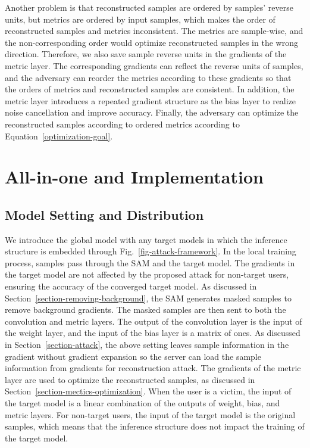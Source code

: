 \documentclass[lettersize,journal]{IEEEtran}
\begin{document}
Another problem is that reconstructed samples are ordered by samples' reverse units, but metrics are ordered by input samples, which makes the order of reconstructed samples and metrics inconsistent. The metrics are sample-wise, and the non-corresponding order would optimize reconstructed samples in the wrong direction. Therefore, we also save sample reverse units in the gradients of the metric layer. The corresponding gradients can reflect the reverse units of samples, and the adversary can reorder the metrics according to these gradients so that the orders of metrics and reconstructed samples are consistent. In addition, the metric layer introduces a repeated gradient structure as the bias layer to realize noise cancellation and improve accuracy. Finally, the adversary can optimize the reconstructed samples according to ordered metrics according to Equation~\eqref{optimization-goal}.

\section{All-in-one and Implementation}
\label{section-all-in-one}

\subsection{Model Setting and Distribution}
We introduce the global model with any target models in which the inference structure is embedded through Fig.~\ref{fig-attack-framework}. In the local training process, samples pass through the SAM and the target model. The gradients in the target model are not affected by the proposed attack for non-target users, ensuring the accuracy of the converged target model. As discussed in Section~\ref{section-removing-background}, the SAM generates masked samples to remove background gradients. The masked samples are then sent to both the convolution and metric layers. The output of the convolution layer is the input of the weight layer, and the input of the bias layer is a matrix of ones. As discussed in Section~\ref{section-attack}, the above setting leaves sample information in the gradient without gradient expansion so the server can load the sample information from gradients for reconstruction attack.
The gradients of the metric layer are used to optimize the reconstructed samples, as discussed in Section~\ref{section-mectics-optimization}. When the user is a victim, the input of the target model is a linear combination of the outputs of weight, bias, and metric layers. For non-target users, the input of the target model is the original samples, which means that the inference structure does not impact the training of the target model.
\end{document}
